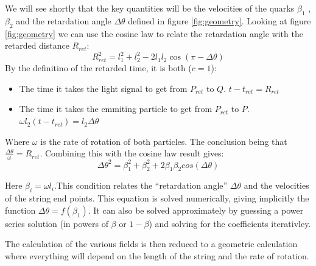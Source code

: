 \documentclass[11pt,a4paper]{article}
\begin{document}
We will see shortly that the key quantities will be the velocities of the quarks $\beta_1$ ,$\beta_2$ and  the retardation angle $\Delta\theta$ defined in figure \ref{fig:geometry}. Looking at figure \ref{fig:geometry} we can use the cosine law to relate the retardation angle with the retarded distance $R_{ret}$:
\begin{equation*}
R_{ret}^2=l_1^2+l_2^2-2l_1l_2\cos\left(\pi-\Delta\theta\right)
\end{equation*} 
By the definitino of the retarded time, it is both ($c=1$):
\begin{itemize}
\item The time it takes the light signal to get from $P_{ret}$ to $Q$. $t-t_{ret}=R_{ret}$
\item The time it takes the emmiting particle to get from $P_{ret}$ to $P$. $\omega l_2 \left(t-t_{ret}\right)=l_2\Delta\theta$
\end{itemize}
Where $\omega$ is the rate of rotation of both particles. The conclusion being that $\frac{\Delta\theta}{\omega}=R_{ret}$. Combining this with the cosine law result gives:
\begin{equation}
\label{eq:retardation}
\Delta\theta^{2}=\beta_{1}^{2}+\beta_{2}^{2}+2\beta_{1}\beta_{2}cos\left(\Delta\theta\right)
\end{equation}

Here $\beta_i=\omega l_i$.This condition relates the “retardation angle” $\Delta\theta$ and the velocities of the string end points. This equation is solved numerically, giving implicitly the function $\Delta\theta=f\left(\beta_{1}\right)$.
It can also be solved approximately by guessing a power series solution (in powers of $\beta $ or $1-\beta $) and solving for the coefficients iterativley.

The calculation of the various fields is then reduced to a geometric calculation where everything will depend on the length of the string and the rate of rotation.
\end{document}
